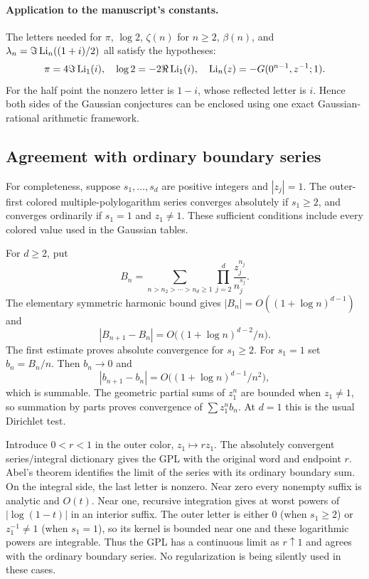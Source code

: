\paragraph{Application to the manuscript's constants.}
The letters needed for $\pi$, $\log2$, $\zeta(n)$ for $n\geq2$,
$\beta(n)$, and $\lambda_n=\Im\operatorname{Li}_n((1+i)/2)$ all satisfy the hypotheses:
\[
 \pi=4\Im\operatorname{Li}_1(i),\quad \log2=-2\Re\operatorname{Li}_1(i),\quad
 \operatorname{Li}_n(z)=-G(0^{n-1},z^{-1};1).
\]
For the half point the nonzero letter is $1-i$, whose reflected letter
is $i$. Hence both sides of the Gaussian conjectures can be enclosed
using one exact Gaussian-rational arithmetic framework.

\subsection{Agreement with ordinary boundary series}

For completeness, suppose $s_1,\ldots,s_d$ are positive integers and
$|z_j|=1$. The outer-first colored multiple-polylogarithm series converges
absolutely if $s_1\geq2$, and converges ordinarily if $s_1=1$ and
$z_1\ne1$. These sufficient conditions include every colored value used
in the Gaussian tables.

For $d\geq2$, put
\[
 B_n=\sum_{n>n_2>\cdots>n_d\geq1}
       \prod_{j=2}^d\frac{z_j^{n_j}}{n_j^{s_j}}.
\]
The elementary symmetric harmonic bound gives
$|B_n|=O((1+\log n)^{d-1})$ and
\[
 |B_{n+1}-B_n|
   =O\bigl((1+\log n)^{d-2}/n\bigr).
\]
The first estimate proves absolute convergence for $s_1\geq2$.
For $s_1=1$ set $b_n=B_n/n$. Then $b_n\to0$ and
\[
 |b_{n+1}-b_n|
    =O\bigl((1+\log n)^{d-1}/n^2\bigr),
\]
which is summable. The geometric partial sums of $z_1^n$ are bounded
when $z_1\ne1$, so summation by parts proves convergence of
$\sum z_1^n b_n$. At $d=1$ this is the usual Dirichlet test.

Introduce $0<r<1$ in the outer color, $z_1\mapsto rz_1$. The absolutely
convergent series/integral dictionary gives the GPL with the original
word and endpoint $r$. Abel's theorem identifies the limit of the
series with its ordinary boundary sum. On the integral side, the last
letter is nonzero. Near zero every nonempty suffix is analytic and
$O(t)$. Near one, recursive integration gives at worst powers of
$|\log(1-t)|$ in an interior suffix. The outer letter is either $0$
(when $s_1\geq2$) or $z_1^{-1}\ne1$ (when $s_1=1$), so its kernel is
bounded near one and these logarithmic powers are integrable. Thus the
GPL has a continuous limit as $r\uparrow1$ and agrees with the ordinary
boundary series. No regularization is being silently used in these
cases.
